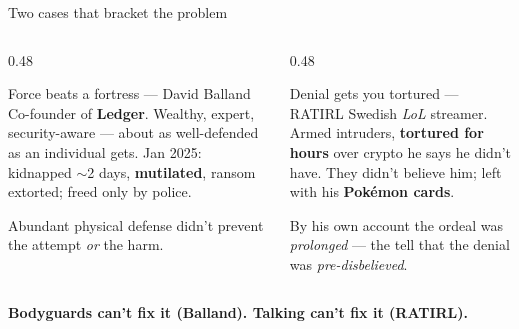 \documentclass[aspectratio=169,11pt]{beamer}
\begin{document}
\begin{frame}{Two cases that bracket the problem}
  \begin{columns}[T]
    \begin{column}{0.48\textwidth}
      \begin{block}{Force beats a fortress --- David Balland}
        \footnotesize
        Co-founder of \textbf{Ledger}. Wealthy, expert, security-aware --- about as
        well-defended as an individual gets.
        \vspace{3pt}
        Jan 2025: kidnapped $\sim$2 days, \textbf{mutilated}, ransom extorted;
        freed only by police.
      \end{block}
      \scriptsize\color{graytext} Abundant physical defense didn't prevent the
      attempt \emph{or} the harm.
    \end{column}
    \begin{column}{0.48\textwidth}
      \begin{block}{Denial gets you tortured --- RATIRL}
        \footnotesize
        Swedish \emph{LoL} streamer. Armed intruders, \textbf{tortured for hours}
        over crypto he says he didn't have.
        \vspace{3pt}
        They didn't believe him; left with his \textbf{Pok\'emon cards}.
      \end{block}
      \scriptsize\color{graytext} By his own account the ordeal was
      \emph{prolonged} --- the tell that the denial was \emph{pre-disbelieved}.
    \end{column}
  \end{columns}
  \vspace{6pt}
  \begin{center}\small
  \textbf{\color{accentdark}Bodyguards can't fix it (Balland). Talking can't fix
  it (RATIRL).}
  \end{center}
\end{frame}
\end{document}
